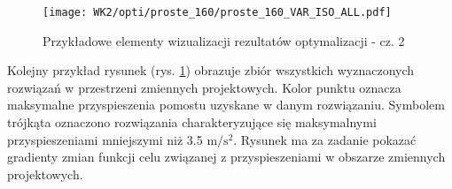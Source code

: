 \begin{figure}[hbt!]
	\centering
	\texttt{[image: WK2/opti/proste\_160/proste\_160\_VAR\_ISO\_ALL.pdf]}
	\captionsetup{justification=centering}
	\caption{Przykładowe elementy wizualizacji rezultatów optymalizacji - cz. 2}
	\label{fig:EXAMPLE_picture_3}
\end{figure}

Kolejny przykład rysunek (rys. \ref{fig:EXAMPLE_picture_3}) obrazuje zbiór wszystkich wyznaczonych rozwiązań w przestrzeni zmiennych projektowych. Kolor punktu oznacza maksymalne przyspieszenia pomostu uzyskane w danym rozwiązaniu. Symbolem trójkąta oznaczono rozwiązania charakteryzujące się maksymalnymi przyspieszeniami mniejszymi niż 3.5 $\mathrm{m/s^2}$. Rysunek ma za zadanie pokazać gradienty zmian funkcji celu związanej z przyspieszeniami w obszarze zmiennych projektowych.


